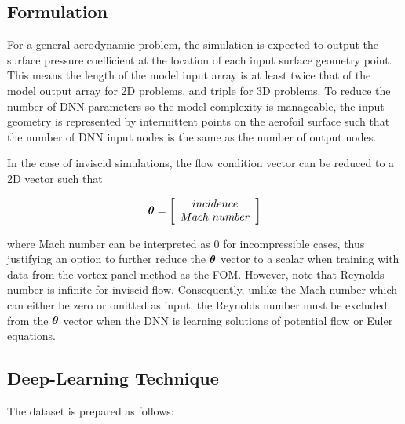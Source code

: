 \documentclass[11pt]{article}
\begin{document}
\subsection{Formulation}

For a general aerodynamic problem, the simulation is expected to output the surface pressure coefficient at the location of each input surface geometry point. This means the length of the model input array is at least twice that of the model output array for 2D problems, and triple for 3D problems. To reduce the number of DNN parameters so the model complexity is manageable, the input geometry is represented by intermittent points on the aerofoil surface such that the number of DNN input nodes is the same as the number of output nodes.

In the case of inviscid simulations, the flow condition vector can be reduced to a 2D vector such that

\begin{equation}
	\label{eqn:2}
    \hm{\theta} =
    \left[ {\begin{array}{cc}
    incidence \\
    Mach ~ number \\
    \end{array} } \right]
\end{equation}

where Mach number can be interpreted as 0 for incompressible cases, thus justifying an option to further reduce the $\hm{\theta}$ vector to a scalar when training with data from the vortex panel method as the FOM. However, note that Reynolds number is infinite for inviscid flow. Consequently, unlike the Mach number which can either be zero or omitted as input, the Reynolds number must be excluded from the $\hm{\theta}$ vector when the DNN is learning solutions of potential flow or Euler equations.

\subsection{Deep-Learning Technique}

The dataset is prepared as follows:
\end{document}
